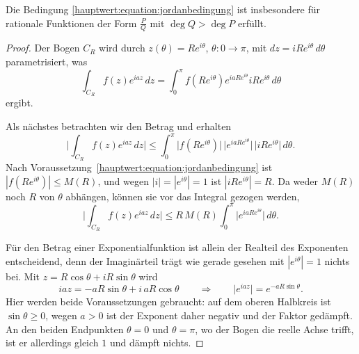 Die Bedingung \eqref{hauptwert:equation:jordanbedingung} ist insbesondere
für rationale Funktionen der Form $\frac{P}{Q}$ mit $\deg Q > \deg P$ erfüllt.

\begin{proof}
  Der Bogen $C_R$ wird durch
  $z(\theta) = R e^{i \theta}$, $\theta\colon 0 \to \pi$, mit
  $dz = i R e^{i \theta}\,d\theta$ parametrisiert, was
  \begin{equation}
    \int_{C_R} f(z) e^{iaz}\,dz
    =
    \int_{0}^{\pi} f(R e^{i \theta}) e^{i a R e^{i \theta}} i R e^{i \theta}\,d\theta
  \end{equation}
  ergibt.

  Als nächstes betrachten wir den Betrag und erhalten
  \begin{equation}
    \biggl| \int_{C_R} f(z) e^{iaz}\,dz \biggr|
    \le
    \int_{0}^{\pi}
      \bigl| f(Re^{i\theta}) \bigr|\,
      \bigl| e^{iaRe^{i\theta}} \bigr|\,
      \bigl| i R e^{i \theta} \bigr|
      \,d\theta.
  \end{equation}
  Nach Voraussetzung~\eqref{hauptwert:equation:jordanbedingung} ist
  $|f(Re^{i\theta})| \le M(R)$, und wegen $|i| = |e^{i\theta}| = 1$ ist
  $|iRe^{i\theta}| = R$.
  Da weder $M(R)$ noch $R$ von $\theta$ abhängen, können sie vor das
  Integral gezogen werden,
  \begin{equation}
    \biggl| \int_{C_R} f(z) e^{iaz}\,dz \biggr|
    \le
    R\,M(R) \int_{0}^{\pi} \bigl| e^{iaRe^{i\theta}} \bigr| \,d\theta.
    \label{hauptwert:equation:jordanabschaetzung}
  \end{equation}

  Für den Betrag einer Exponentialfunktion ist allein der Realteil des
  Exponenten entscheidend, denn der Imaginärteil trägt wie gerade gesehen mit
  $|e^{i\theta}| = 1$ nichts bei.
  Mit $z = R\cos\theta + iR\sin\theta$ wird
  \begin{equation}
    iaz
    =
    -aR\sin\theta + i\,aR\cos\theta
    \qquad\Rightarrow\qquad
    \bigl| e^{iaz} \bigr| = e^{-aR\sin\theta}.
    \label{hauptwert:equation:jordandaempfung}
  \end{equation}
  Hier werden beide Voraussetzungen gebraucht: auf dem oberen Halbkreis ist
  $\sin\theta \ge 0$, wegen $a > 0$ ist der Exponent daher negativ und der
  Faktor gedämpft.
  An den beiden Endpunkten $\theta = 0$ und $\theta = \pi$, wo der Bogen
  die reelle Achse trifft, ist er allerdings gleich $1$ und dämpft nichts.


\end{proof}
